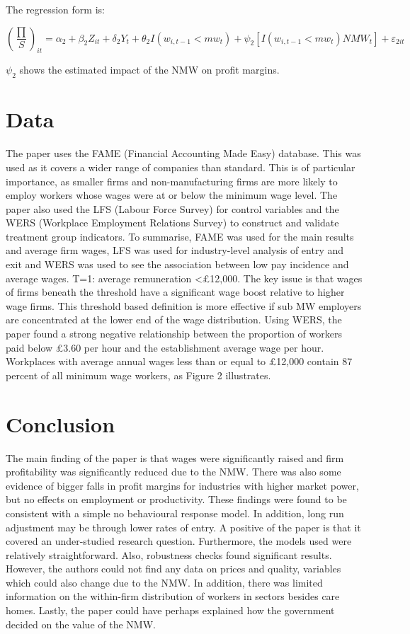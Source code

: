 \documentclass[12pt]{article}
\begin{document}
The regression form is:

\[(\frac{\prod}{S})_{it}= \alpha_2+ \beta_2Z_{it}+ \delta_2Y_t+ \theta_2I(w_{i,t-1}<mw_t)+ \psi_2[I(w_{i,t-1}<mw_t)NMW_t]+ \varepsilon_{2it}\]

$\psi_2$ shows the estimated impact of the NMW on profit margins.

\section{Data}

The paper uses the FAME (Financial Accounting Made Easy) database. This was used as it covers a wider range of companies than standard. This is of particular importance, as smaller firms and non-manufacturing firms are more likely to employ workers whose wages were at or below the minimum wage level. The paper also used the LFS (Labour Force Survey) for control variables and the WERS (Workplace Employment Relations Survey) to construct and validate treatment group indicators. To summarise, FAME was used for the main results and average firm wages, LFS was used for industry-level analysis of entry and exit and WERS was used to see the association between low pay incidence and average wages. T=1: average remuneration <£12,000. The key issue is that wages of firms beneath the threshold have a significant wage boost relative to higher wage firms. This threshold based definition is more effective if sub MW employers are concentrated at the lower end of the wage distribution. Using WERS, the paper found a strong negative relationship between the proportion of workers paid below £3.60 per hour and the establishment average wage per hour. Workplaces with average annual wages less than or equal to £12,000 contain 87 percent of all minimum wage workers, as Figure 2 illustrates. 

\section{Conclusion}

The main finding of the paper is that wages were significantly raised and firm profitability was significantly reduced due to the NMW. There was also some evidence of bigger falls in profit margins for industries with higher market power, but no effects on employment or productivity. These findings were found to be consistent with a simple no behavioural response model. In addition, long run adjustment may be through lower rates of entry. A positive of the paper is that it covered an under-studied research question. Furthermore, the models used were relatively straightforward. Also, robustness checks found significant results. However, the authors could not find any data on prices and quality, variables which could also change due to the NMW. In addition, there was limited information on the within-firm distribution of workers in sectors besides care homes. Lastly, the paper could have perhaps explained how the government decided on the value of the NMW. 
\end{document}
